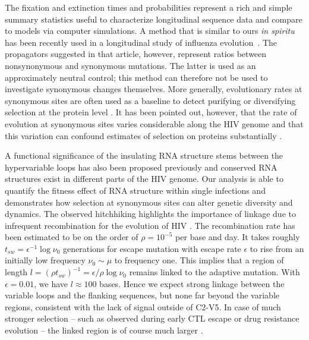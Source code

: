 \documentclass[rmp, twocolumn]{revtex4}
\newcommand{\shankaregion}{C2-V5}
\begin{document}
The fixation and extinction times and probabilities represent a rich and simple
summary statistics useful to characterize longitudinal sequence data and compare
to models via computer simulations. A method that is similar to ours {\it in
spiritu} has been recently used in a longitudinal study of influenza
evolution~\citep{strelkowa_clonal_2012}. The propagators suggested in that
article, however, represent ratios between nonsynonymous and synonymous
mutations. The latter is used as an approximately neutral control; this method
can therefore not be used to investigate synonymous changes themselves. More
generally, evolutionary rates at synonymous sites are often used as a baseline
to detect purifying or diversifying selection at the protein level
\cite{Hurst:2002p32608}. It has been pointed out, however, that the rate of
evolution at synonymous sites varies considerable along the HIV genome
\citep{mayrose_towards_2007} and that this variation can confound estimates of
selection on proteins substantially \citep{ngandu_extensive_2008}.

A functional significance of the insulating RNA structure stems between the
hypervariable loops has also been proposed previously
\citep{watts_architecture_2009, sanjuan_interplay_2011} and conserved RNA
structures exist in different parts of the HIV genome. Our analysis is able to
quantify the fitness effect of RNA structure within single infections and
demonstrates how selection at synonymous sites can alter genetic diversity and
dynamics. The observed hitchhiking highlights the importance of linkage due to
infrequent recombination for the evolution of HIV
\citep{neher_recombination_2010, batorsky_estimate_2011,
josefsson_majority_2011}. The recombination rate has been estimated to be on the
order of $\rho = 10^{-5}$ per base and day. It takes roughly $t_{sw} =
\epsilon^{-1} \log \nu_0$ generations for escape mutation with escape rate
$\epsilon$ to rise from an initially low frequency $\nu_0\sim \mu$ to frequency
one. This implies that a region of length $l = (\rho t_{sw})^{-1} = \epsilon /
\rho \log \nu_0$ remains linked to the adaptive mutation. With $\epsilon=0.01$,
we have $l\approx 100$ bases. Hence we expect strong linkage between the
variable loops and the flanking sequences, but none far beyond the variable
regions, consistent with the lack of signal outside of \shankaregion. In case of
much stronger selection -- such as observed during early CTL escape or drug
resistance evolution -- the linked region is of course much larger
\citep{nijhuis_stochastic_1998}. 
\end{document}
